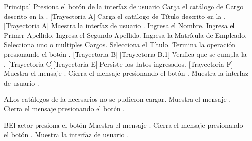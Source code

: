 \begin{UCtrayectoria}{Principal}
    \UCpaso[\UCactor] Presiona el botón  de la interfaz de usuario 
    \UCpaso Carga el catálogo de Cargo descrito en la . [Trayectoria A]
    \UCpaso Carga el catálogo de Título descrito en la . [Trayectoria A]
    \UCpaso Muestra la interfaz de usuario .
    \UCpaso[\UCactor] Ingresa el Nombre.
    \UCpaso[\UCactor] Ingresa el Primer Apellido.
    \UCpaso[\UCactor] Ingresa el Segundo Apellido.
    \UCpaso[\UCactor] Ingresa la Matrícula de Empleado.
    \UCpaso[\UCactor] Selecciona uno o multiples Cargos.
    \UCpaso[\UCactor] Selecciona el Título.
    \UCpaso[\UCactor] Termina la operación presionando el botón . [Trayectoria B] [Trayectoria B.1]
    \UCpaso Verifica que se cumpla la . [Trayectoria C][Trayectoria E]
    \UCpaso Persiste los datos ingresados. [Trayectoria F]
    \UCpaso Muestra el mensaje .
    \UCpaso[\UCactor] Cierra el mensaje presionando el botón .
    \UCpaso Muestra la interfaz de usuario .
\end{UCtrayectoria}
\begin{UCtrayectoriaA}{A}{Los catálogos de la  necesarios no se pudieron cargar.}
    \UCpaso Muestra el mensaje .
    \UCpaso[\UCactor] Cierra el mensaje presionando el botón .
\end{UCtrayectoriaA}
\begin{UCtrayectoriaA}{B}{El actor presiona el botón }
    \UCpaso Muestra el mensaje .
    \UCpaso[\UCactor] Cierra el mensaje presionando el botón .
    \UCpaso Muestra la interfaz de usuario .
\end{UCtrayectoriaA}

